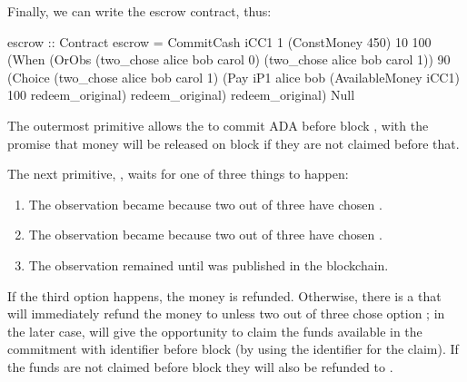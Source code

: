 \documentclass[runningheads]{llncs}
\begin{document}
Finally, we can write the escrow contract, thus:
\begin{haskellcode}
escrow :: Contract
escrow = CommitCash iCC1 1 (ConstMoney 450) 10 100
                    (When (OrObs (two_chose alice bob carol 0)
                                 (two_chose alice bob carol 1))
                          90
                          (Choice (two_chose alice bob carol 1)
                                  (Pay iP1 alice bob (AvailableMoney iCC1) 100
                                       redeem_original)
                                  redeem_original)
                          redeem_original)
                    Null
\end{haskellcode}

The outermost primitive  allows the  to commit 
 ADA before block , with the promise that money will be released on block 
 if they are not claimed before that.

The next primitive, , waits for one of three things to happen:
\begin{enumerate}
	\item The observation became  because two out of three have chosen . 
	\item The observation became  because two out of three have chosen .
	\item The observation remained  until  was published in the blockchain.
\end{enumerate}

If the third option happens, the money is refunded. Otherwise, there is a  that will 
immediately refund the money to  unless two out of three chose option 
; 
in the later case,  will give  the opportunity to claim the funds 
available in the commitment with identifier  before block  (by using the 
identifier  for the claim). If the funds are not claimed before block  they will 
also be refunded to .
\end{document}
